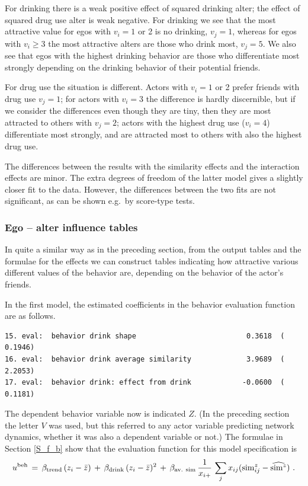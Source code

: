 \documentclass[a4paper,fleqn]{article}
\newcommand{\+}{\, + \,}
\begin{document}
{For drinking there is a weak positive effect of squared drinking alter;
the effect of squared drug use alter is weak negative.
For drinking we see that the most attractive value
for egos with $v_i = 1$ or 2 is no drinking, $v_j = 1$,
whereas for egos with $v_i \geq 3$ the most attractive alters
are those who drink most, $v_j = 5$.
We also see that egos with the highest drinking
behavior are those who differentiate most strongly
depending on the drinking behavior of their potential friends.

For drug use the situation is different.
Actors with $v_i = 1$ or 2 prefer friends with drug use $v_j = 1$;
for actors with $v_i = 3$ the difference is hardly discernible,
but if we consider the differences even though they are tiny,
then they are most attracted to others with $v_j = 2$;
actors with the highest drug use ($v_i = 4$) differentiate most strongly,
and are attracted most to others with also the highest drug use.

The differences between the results with the similarity effects and the
interaction effects are minor. The extra degrees of freedom of the
latter model gives a slightly closer fit to the data.
However, the differences between the two fits are not significant,
as can be shown e.g.\ by score-type tests.

\subsubsection{Ego -- alter influence tables}

In quite a similar way as in the preceding section,
from the output tables and the formulae for the effects
we can construct tables indicating how attractive
various different values of the behavior are,
depending on the behavior of the actor's friends.

In the first model, the estimated coefficients in the
behavior evaluation function are as follows.
\begin{verbatim}
15. eval:  behavior drink shape                          0.3618  (   0.1946)
16. eval:  behavior drink average similarity             3.9689  (   2.2053)
17. eval:  behavior drink: effect from drink            -0.0600  (   0.1181)
\end{verbatim}
The dependent behavior variable now is indicated $Z$. (In the preceding
section the letter $V$ was used, but this referred to any actor variable
predicting network dynamics,
whether it was also a dependent variable or not.)
The formulae in Section \ref{S_f_b} show that the evaluation function
for this model specification is
\begin{equation}
   u^{\rm beh} \,=\, \beta_{\rm trend} \, (z_i - \bar z) \,+\, \beta_{\rm drink} \, (z_i - \bar z)^2 \,+\,
                   \beta_{\rm av.\ sim}\,  \frac{1}{x_{i+}} \,
                    \sum_j x_{ij} ({\rm sim}^z_{ij} - \widehat{{\rm sim}^z}) \ .
                    \label{eq_f_b1}
\end{equation}

}
\end{document}
